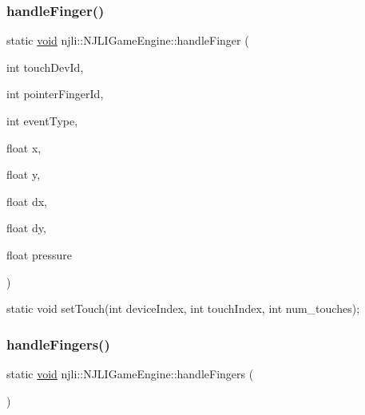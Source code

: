 \subsubsection{\texorpdfstring{handle\+Finger()}{handleFinger()}}
{\footnotesize\ttfamily static \mbox{\hyperlink{_thread_8h_af1e856da2e658414cb2456cb6f7ebc66}{void}} njli\+::\+N\+J\+L\+I\+Game\+Engine\+::handle\+Finger (\begin{DoxyParamCaption}\item[{int}]{touch\+Dev\+Id,  }\item[{int}]{pointer\+Finger\+Id,  }\item[{int}]{event\+Type,  }\item[{float}]{x,  }\item[{float}]{y,  }\item[{float}]{dx,  }\item[{float}]{dy,  }\item[{float}]{pressure }\end{DoxyParamCaption})\hspace{0.3cm}{\ttfamily [static]}}

static void set\+Touch(int device\+Index, int touch\+Index, int num\+\_\+touches); \mbox{\label{classnjli_1_1_n_j_l_i_game_engine_a136a6550305dec3c346255c55419f691}} 
\subsubsection{\texorpdfstring{handle\+Fingers()}{handleFingers()}}
{\footnotesize\ttfamily static \mbox{\hyperlink{_thread_8h_af1e856da2e658414cb2456cb6f7ebc66}{void}} njli\+::\+N\+J\+L\+I\+Game\+Engine\+::handle\+Fingers (\begin{DoxyParamCaption}{ }\end{DoxyParamCaption})\hspace{0.3cm}{\ttfamily [static]}}

\mbox{\label{classnjli_1_1_n_j_l_i_game_engine_a56ca64c01ac4d79123229af44a8c2228}} 
